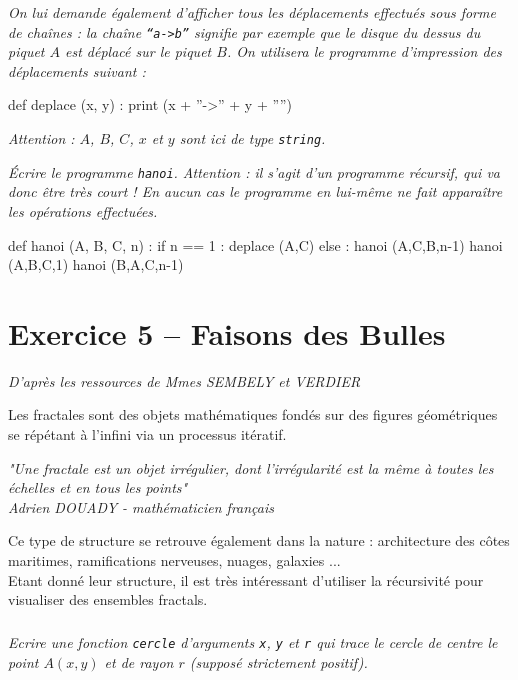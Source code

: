 \textit{On lui demande également d'afficher tous les déplacements effectués sous forme de chaînes  : la chaîne 
\texttt{``a->b''} signifie par exemple que le disque du dessus du piquet $A$ est déplacé sur le piquet $B$. On 
utilisera le programme 
d'impression des déplacements suivant :\\}

\begin{py}
\begin{python}
def deplace (x, y) :
    print (x + ''->'' + y + ''\n'')
\end{python}
\end{py}

\textit{Attention : $A$, $B$, $C$, $x$ et $y$ sont ici de type \texttt{string}.\\}

\textit{Écrire le programme \texttt{hanoi}. Attention : il s'agit d'un programme récursif, qui va donc être très court 
! En 
aucun cas le programme en lui-même ne fait apparaître les opérations effectuées.}

\ifprof
\begin{corrige}

\begin{py}
\begin{python}
def hanoi (A, B, C, n) :
    if n == 1 :
	deplace (A,C)
    else :
	hanoi (A,C,B,n-1)
	hanoi (A,B,C,1)
	hanoi (B,A,C,n-1)
\end{python}
\end{py}

\end{corrige}
\else
\fi

\section*{Exercice 5 -- Faisons des Bulles}
\textit{ D'après les ressources de Mmes SEMBELY et VERDIER}
\setcounter{subparagraph}{0}

Les fractales sont des objets mathématiques fondés sur des figures géométriques se répétant à l'infini via un processus 
itératif.
\begin{center}
\textit{ "Une fractale est un objet irrégulier, dont l'irrégularité est la même à toutes les échelles et en tous les 
points"
\\
Adrien DOUADY - mathématicien français}
\end{center}
Ce type de structure se retrouve également dans la nature : architecture des côtes maritimes, ramifications nerveuses, 
nuages, galaxies ...
\\
Etant donné leur structure, il est très intéressant d'utiliser la récursivité pour visualiser des ensembles fractals.
\\
\subparagraph{}
\textit{Ecrire une fonction \texttt{cercle} d'arguments \texttt{x}, \texttt{y} et \texttt{r} qui trace le cercle de 
centre le point $A(x, y)$ et de rayon $r$ (supposé strictement positif).}


